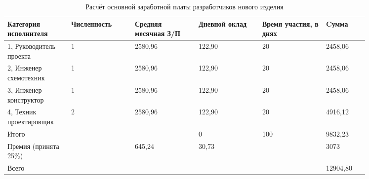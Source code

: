 \begin{table}[H]
  \small
  \caption{Расчёт основной заработной платы
    разработчиков нового изделия}
  \begin{tabular}{|p{0.15\linewidth}|p{0.15\linewidth}|p{0.15\linewidth}|p{0.15\linewidth}|p{0.15\linewidth}|p{0.1\linewidth}|}
    \hline
Категория исполнителя & Численность & Средняя месячная З/П & Дневной оклад & Время участия, в днях & Cумма\\[0pt]
\hline
    1, Руководитель проекта & 1 & 2580,96 & 122,90 & 20 & 2458,06\\[0pt]
    \hline
    2, Инженер схемотехник & 1 & 2580,96 & 122,90 & 20 & 2458,06\\[0pt]
    \hline
    3, Инженер конструктор & 1 & 2580,96 & 122,90 & 20 & 2458,06\\[0pt]
    \hline
    4, Техник проектировщик & 2 & 2580,96 & 122,90 & 20 & 4916,12\\[0pt]
    \hline
    Итого &  &  & 0 & 100 & 9832,23\\[0pt]
    \hline
    Премия (принята 25\%) &  & 645,24 & 30,73 &  & 3073 \\[0pt]
    \hline
    Всего &  &  &   &  & 12904,80\\[0pt]
    \hline
\end{tabular}
\end{table}

